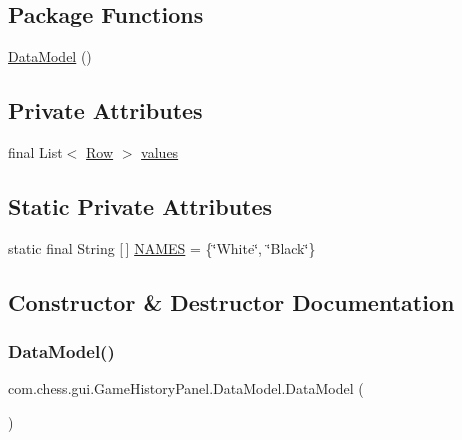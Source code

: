 \subsection*{Package Functions}
\begin{DoxyCompactItemize}
\item 
\mbox{\hyperlink{classcom_1_1chess_1_1gui_1_1_game_history_panel_1_1_data_model_afe545a0f930c532c5e3809632f012957}{Data\+Model}} ()
\end{DoxyCompactItemize}
\subsection*{Private Attributes}
\begin{DoxyCompactItemize}
\item 
final List$<$ \mbox{\hyperlink{classcom_1_1chess_1_1gui_1_1_game_history_panel_1_1_row}{Row}} $>$ \mbox{\hyperlink{classcom_1_1chess_1_1gui_1_1_game_history_panel_1_1_data_model_aa76576b13ba42a5d8f9994605d187517}{values}}
\end{DoxyCompactItemize}
\subsection*{Static Private Attributes}
\begin{DoxyCompactItemize}
\item 
static final String \mbox{[}$\,$\mbox{]} \mbox{\hyperlink{classcom_1_1chess_1_1gui_1_1_game_history_panel_1_1_data_model_abb2f0f82fb40c586572bd7a9d196e1a2}{N\+A\+M\+ES}} = \{\char`\"{}White\char`\"{}, \char`\"{}Black\char`\"{}\}
\end{DoxyCompactItemize}


\subsection{Constructor \& Destructor Documentation}
\mbox{\label{classcom_1_1chess_1_1gui_1_1_game_history_panel_1_1_data_model_afe545a0f930c532c5e3809632f012957}} 
\subsubsection{\texorpdfstring{DataModel()}{DataModel()}}
{\footnotesize\ttfamily com.\+chess.\+gui.\+Game\+History\+Panel.\+Data\+Model.\+Data\+Model (\begin{DoxyParamCaption}{ }\end{DoxyParamCaption})\hspace{0.3cm}{\ttfamily [package]}}



